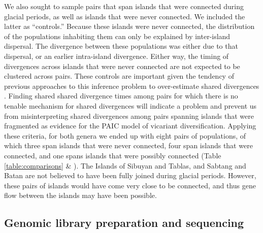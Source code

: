 We also sought to sample pairs that span islands that were connected during
glacial periods, as well as islands that were never connected.
We included the latter as ``controls.''
Because these islands were never connected, the distribution of the populations
inhabiting them can only be explained by inter-island dispersal.
The divergence between these populations was either due to that
dispersal, or an earlier intra-island divergence.
Either way, the timing of divergences across islands that were never connected
are not expected to be clustered across pairs.
These controls are important given the tendency of previous approaches to this
inference problem to over-estimate shared divergences
\citep{Oaks2012,Oaks2014reply}.
Finding shared shared divergence times among pairs for which there is no
tenable mechanism for shared divergences will indicate a problem and prevent us
from misinterpreting shared divergences among pairs spanning islands that were
fragmented as evidence for the PAIC model of vicariant diversification.
Applying these criteria, for both genera we ended up with eight pairs of
populations, of which three span islands that were never connected, four span
islands that were connected, and one spans islands that were possibly connected
(Table \ref{table:comparisons} \& ).
The Islands of Sibuyan and Tablas, and Sabtang and Batan are not believed to
have been fully joined during glacial periods.
However, these pairs of islands would have come very close to be connected, and
thus gene flow between the islands may have been possible.

\subsection{Genomic library preparation and sequencing}

